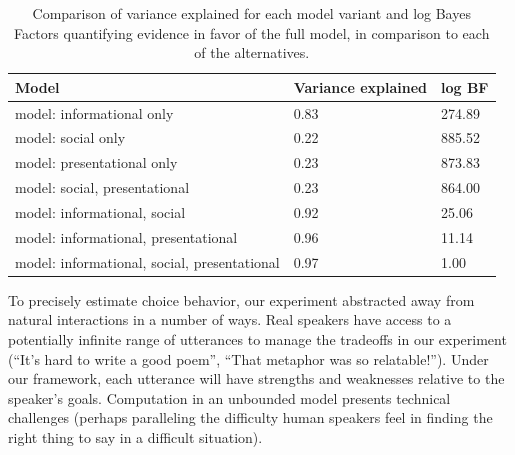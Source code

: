 \documentclass[12pt]{article}
\begin{document}
\begin{table}[tbp]
\begin{center}
\begin{threeparttable}
\caption{\label{tab:comparisonTable}Comparison of variance explained for each model variant and log Bayes Factors quantifying evidence in favor of the full model, in comparison to each of the alternatives.}
\begin{tabular}{lll}
\toprule
Model & \multicolumn{1}{c}{Variance
explained} & \multicolumn{1}{c}{log BF}\\
\midrule
model:
informational only & 0.83 & 274.89\\
model:
social only & 0.22 & 885.52\\
model:
presentational
only & 0.23 & 873.83\\
model:
social,
presentational & 0.23 & 864.00\\
model:
informational,
social & 0.92 & 25.06\\
model:
informational,
presentational & 0.96 & 11.14\\
model:
informational,
social,
presentational & 0.97 & 1.00\\
\bottomrule
\end{tabular}
\end{threeparttable}
\end{center}
\end{table}



To precisely estimate choice behavior, our experiment abstracted away from
natural interactions in a number of ways. Real speakers have access to a potentially infinite range of utterances to manage the tradeoffs in our experiment (\enquote{It's hard to write a good poem}, \enquote{That
metaphor was so relatable!}). Under our framework, each utterance will have strengths and weaknesses relative to the speaker's goals. Computation in an unbounded model presents technical challenges \cite{goodman2016} (perhaps paralleling the difficulty human speakers feel in finding the right thing to say in a difficult situation).

\end{document}
